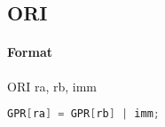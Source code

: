 \subsection{ORI}


\paragraph{Format} ORI ra, rb, imm

\begin{lstlisting}[language=C]
    GPR[ra] = GPR[rb] | imm;
\end{lstlisting}